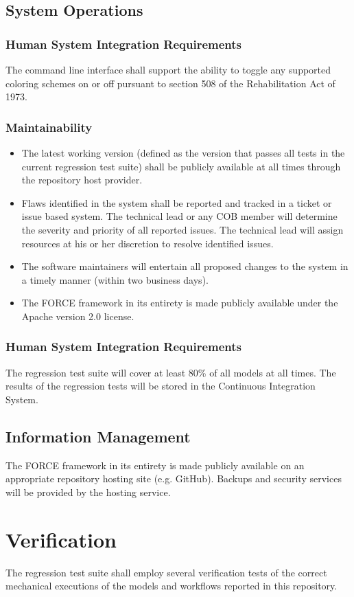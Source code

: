 \subsection{System Operations}
\subsubsection{Human System Integration Requirements}
The command line interface shall support the ability to toggle any supported coloring schemes on or off pursuant to section 
508 of the Rehabilitation Act of 1973.
\subsubsection{Maintainability}
\begin{itemize}
  \item The latest working version (defined as the version that passes all tests in the current regression test suite) shall be 
           publicly available at all times through the repository host provider.
  \item  Flaws identified in the system shall be reported and tracked in a ticket or issue based system. The technical lead or 
            any COB member will 
            determine the severity and priority of all reported issues. The technical lead will assign resources at his or her 
            discretion to resolve identified issues.
  \item  The software maintainers will entertain all proposed changes to the system in a timely manner 
           (within two business days).        
  \item  The FORCE framework in its entirety is made publicly available under the Apache version 2.0 license.
\end{itemize}
\subsubsection{Human System Integration Requirements}
The regression test suite will cover at least 80\% of all models at all times.
The results of the regression tests will be stored in the Continuous Integration System.

\subsection{Information Management}
The FORCE framework in its entirety is made publicly available on an appropriate repository hosting site (e.g. GitHub).
Backups and security services will be provided by the hosting service.

\section{Verification}
The regression test suite shall employ several verification tests of the correct mechanical executions
of the models and workflows reported in this repository.
